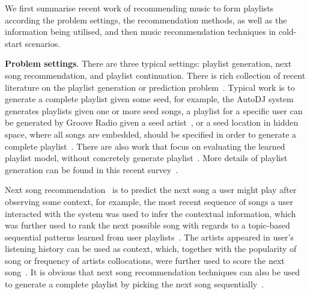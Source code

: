 

We first summarise recent work of recommending music to form playlists
according the problem settings, the recommendation methods,
as well as the information being utilised,
and then music recommendation techniques in cold-start scenarios.


{\bf Problem settings}.
There are three typical settings:
playlist generation, next song recommendation, and playlist continuation.
%
There is rich collection of recent literature on the playlist generation or prediction
problem~\cite{platt2002learning,mcfee2011natural,mcfee2012hypergraph,chen2012playlist,ben2017groove}.
%
Typical work is to generate a complete playlist given some seed,
for example, the AutoDJ system~\cite{platt2002learning} generates playlists given one or more seed songs,
a playlist for a specific user can be generated by Groove Radio given a seed artist~\cite{ben2017groove},
or a seed location in hidden space, where all songs are embedded,
should be specified in order to generate a complete playlist~\cite{chen2012playlist}.
%
There are also work that focus on evaluating the learned playlist model,
without concretely generate playlist~\cite{mcfee2011natural,mcfee2012hypergraph}.
More details of playlist generation can be found in this recent survey~\cite{bonnin2015automated}.


Next song recommendation~\cite{hariri2012context,bonnin2013evaluating,jannach2015beyond}
is to predict the next song a user might play after observing some context,
for example, the most recent sequence of songs a user interacted with the system was used to
infer the contextual information, which was further used to rank the next possible song
with regards to a topic-based sequential patterns learned from user playlists~\cite{hariri2012context}.
%
The artists appeared in user's listening history can be used as context,
which, together with the popularity of song or frequency of artists collocations,
were further used to score the next song~\cite{mcfee2012million,bonnin2013evaluating}.
%
It is obvious that next song recommendation techniques can also be used to generate a
complete playlist by picking the next song sequentially~\cite{bonnin2013evaluating,ben2017groove}.



